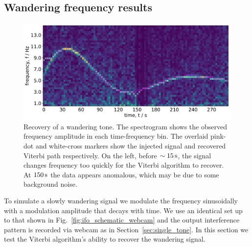 \documentclass[paper-main.tex]{subfiles}
\begin{document}
\subsection{Wandering frequency results}
\label{sec:wanderingResults}

\begin{figure}
	\includegraphics[width=\textwidth]{figures/expt_overlay_2_viterbi_test_webcam.pdf}
	\caption{\label{fig:viterbi_overlay}
Recovery of a wandering tone. 
The spectrogram shows the observed frequency amplitude in each time-frequency bin. 
The overlaid pink-dot and white-cross markers show the injected signal and recovered Viterbi path respectively. 
On the left, before $\sim 15\,{\rm s}$, the signal changes frequency too quickly for the Viterbi algorithm to recover. 
At $150\,{\rm s}$ the data appears anomalous, which may be due to some background noise. }
\end{figure}
 

To simulate a slowly wandering signal we modulate the frequency sinusoidally with a modulation amplitude that decays with time. 
We use an identical set up to that shown in Fig.~\ref{fig:ifo_schematic_webcam} and the output interference pattern is recorded via webcam as in Section~\ref{sec:single_tone}. 
In this section we test the Viterbi algorithm’s ability to recover the wandering signal.
\end{document}
